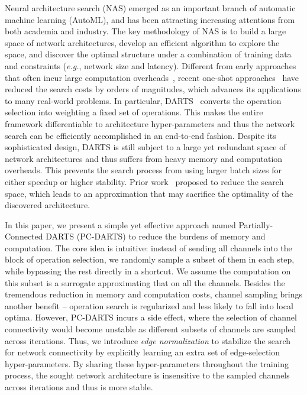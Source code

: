 \documentclass{article} \usepackage{iclr2020_conference,times}
\begin{document}
Neural architecture search (NAS) emerged as an important branch of automatic machine learning (AutoML), and has been attracting increasing attentions from both academia and industry. The key methodology of NAS is to build a large space of network architectures, develop an efficient algorithm to explore the space, and discover the optimal structure under a combination of training data and constraints (\textit{e.g.}, network size and latency). Different from early approaches that often incur large computation overheads~\citep{zoph2016neural,zoph2018learning,real2018regularized}, recent one-shot approaches~\citep{pham2018efficient,liu2018darts} have reduced the search costs by orders of magnitudes, which advances its applications to many real-world problems. In particular, DARTS~\citep{liu2018darts} converts the operation selection into weighting a fixed set of operations. This makes the entire framework differentiable to architecture hyper-parameters and thus the network search can be efficiently accomplished in an end-to-end fashion. Despite its sophisticated design, DARTS is still subject to a large yet redundant space of network architectures and thus suffers from heavy memory and computation overheads. This prevents the search process from using larger batch sizes for either speedup or higher stability. Prior work~\citep{chen2019progressive} proposed to reduce the search space, which leads to an approximation that may sacrifice the optimality of the discovered architecture.



In this paper, we present a simple yet effective approach named Partially-Connected DARTS (PC-DARTS) to reduce the burdens of memory and computation. The core idea is intuitive: instead of sending all channels into the block of operation selection, we randomly sample a subset of them in each step, while bypassing the rest directly in a shortcut. We assume the computation on this subset is a surrogate approximating that on all the channels. Besides the tremendous reduction in memory and computation costs, channel sampling brings another benefit -- operation search is regularized and less likely to fall into local optima. However, PC-DARTS incurs a side effect, where the selection of channel connectivity would become unstable as different subsets of channels are sampled across iterations. Thus, we introduce \textit{edge normalization} to stabilize the search for network connectivity by explicitly learning an extra set of edge-selection hyper-parameters. By sharing these hyper-parameters throughout the training process, the sought network architecture is insensitive to the sampled channels across iterations and thus is more stable.
\end{document}
